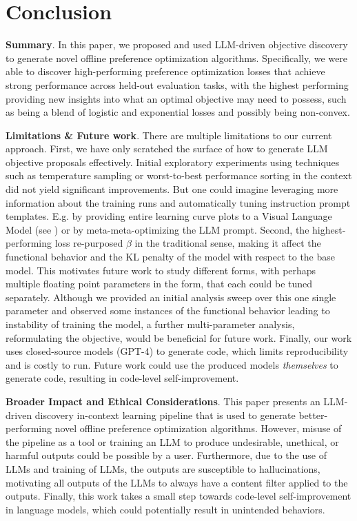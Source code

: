 \documentclass{article}
\theoremstyle{plain}
\theoremstyle{definition}
\theoremstyle{remark}
\begin{document}
\section{Conclusion}
\label{sec:conclusion}

\textbf{Summary}. In this paper, we proposed and used LLM-driven objective discovery to generate novel offline preference optimization algorithms. Specifically, we were able to discover high-performing preference optimization losses that achieve strong performance across held-out evaluation tasks, with the highest performing providing new insights into what an optimal objective may need to possess, such as being a blend of logistic and exponential losses and possibly being non-convex. 

\textbf{Limitations \& Future work}. There are multiple limitations to our current approach. First, we have only scratched the surface of how to generate LLM objective proposals effectively. Initial exploratory experiments using techniques such as temperature sampling or worst-to-best performance sorting in the context did not yield significant improvements. But one could imagine leveraging more information about the training runs and automatically tuning instruction prompt templates. E.g. by providing entire learning curve plots to a Visual Language Model (see ) or by meta-meta-optimizing \citep{lu2023arbitrary} the LLM prompt. Second, the highest-performing loss re-purposed $\beta$ in the traditional sense, making it affect the functional behavior and the KL penalty of the model with respect to the base model. This motivates future work to study different forms, with perhaps multiple floating point parameters in the form, that each could be tuned separately. Although we provided an initial analysis sweep over this one single parameter and observed some instances of the functional behavior leading to instability of training the model, a further multi-parameter analysis, reformulating the objective, would be beneficial for future work. Finally, our work uses closed-source models (GPT-4) to generate code, which limits reproducibility and is costly to run. Future work could use the produced models \textit{themselves} to generate code, resulting in code-level self-improvement.

\textbf{Broader Impact and Ethical Considerations}. This paper presents an LLM-driven discovery in-context learning pipeline that is used to generate better-performing novel offline preference optimization algorithms. However, misuse of the pipeline as a tool or training an LLM to produce undesirable, unethical, or harmful outputs could be possible by a user. Furthermore, due to the use of LLMs and training of LLMs, the outputs are susceptible to hallucinations, motivating all outputs of the LLMs to always have a content filter applied to the outputs. Finally, this work takes a small step towards code-level self-improvement in language models, which could potentially result in unintended behaviors.
\end{document}

